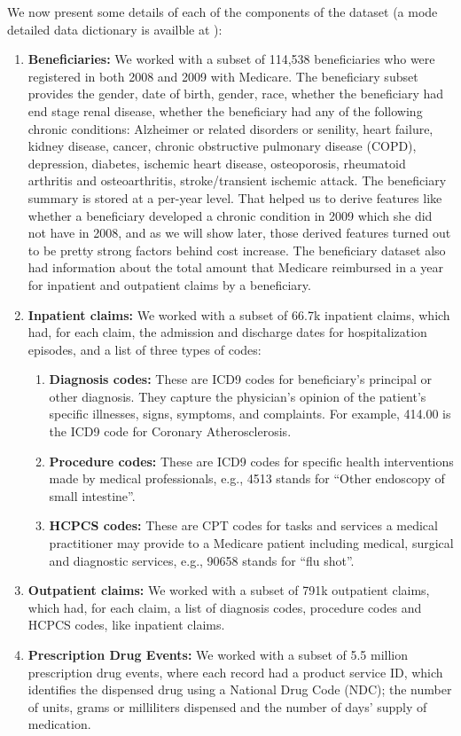 We now present some details of each of the components of the dataset (a mode detailed data dictionary is availble at \cite{datadic}): 
\begin{enumerate}
\item {\bf Beneficiaries:} We worked with a subset of 114,538 beneficiaries who were registered in both 2008 and 2009 with Medicare. The beneficiary subset provides the gender, date of birth, gender, race, whether the beneficiary had end stage renal disease, whether the beneficiary had any of the following chronic conditions: Alzheimer or related disorders or senility, heart failure, kidney disease, cancer, chronic obstructive pulmonary disease (COPD), depression, diabetes, ischemic heart disease, osteoporosis, rheumatoid arthritis and osteoarthritis, stroke/transient ischemic attack. The beneficiary summary is stored at a per-year level. That helped us to derive features like whether a beneficiary developed a chronic condition in 2009 which she did not have in 2008, and as we will show later, those derived features turned out to be pretty strong factors behind cost increase. The beneficiary dataset also had information about the total amount that Medicare reimbursed in a year for inpatient and outpatient claims by a beneficiary.  
\item {\bf Inpatient claims:} We worked with a subset of 66.7k inpatient claims, which had, for each claim, the admission and discharge dates for hospitalization episodes, and a list of three types of codes:
\begin{enumerate}
\item {\bf Diagnosis codes: }These are ICD9 \cite{icd9} codes for beneficiary's principal or other diagnosis. They capture the physician's opinion of the patient's specific illnesses, signs, symptoms, and complaints. For example, 414.00 is the ICD9 code for Coronary Atherosclerosis.
\item {\bf Procedure codes: }These are ICD9 codes for specific health interventions made by medical professionals, e.g., 4513 stands for ``Other endoscopy of small intestine''.
\item {\bf HCPCS codes: }These are CPT codes \cite{cpt} for tasks and services a medical practitioner may provide to a Medicare patient including medical, surgical and diagnostic services, e.g., 90658 stands for ``flu shot''.
\end{enumerate}
\item {\bf Outpatient claims:} We worked with a subset of 791k outpatient claims, which had, for each claim, a list of diagnosis codes, procedure codes and HCPCS codes, like inpatient claims.
\item {\bf Prescription Drug Events: }We worked with a subset of 5.5 million prescription drug events, where each record had a product service ID, which identifies the dispensed drug using a National Drug Code (NDC); the number of units, grams or milliliters dispensed and the number of days' supply of medication.
\end{enumerate}

